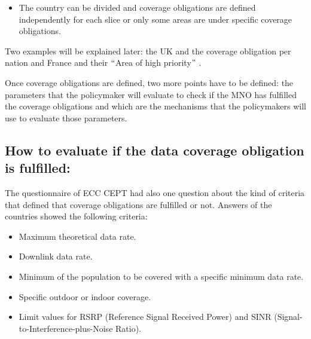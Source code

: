 {\begin{itemize}
\begin{itemize}
	\item The country can be divided and coverage obligations are defined independently for each slice or only some areas are under specific coverage obligations.
\end{itemize}
\end{itemize}

Two examples will be explained later: the UK and the coverage obligation per nation and France and their $``$Area of high priority$"$ .\par

Once coverage obligations are defined, two more points have to be defined: the parameters that the policymaker will evaluate to check if the MNO has fulfilled the coverage obligations and which are the mechanisms that the policymakers will use to evaluate those parameters.\par

\subsection*{How to evaluate if the data coverage obligation is fulfilled:}
The questionnaire of ECC CEPT \cite{2-08} had also one question about the kind of criteria that defined that coverage obligations are fulfilled or not. Answers of the countries showed the following criteria:\par

\begin{itemize}
	\item Maximum theoretical data rate.\par

	\item Downlink data rate.\par

	\item Minimum of the population to be covered with a specific minimum data rate.\par

	\item Specific outdoor or indoor coverage.\par

	\item Limit values for RSRP (Reference Signal Received Power) and SINR (Signal-to-Interference-plus-Noise Ratio).
\end{itemize}\par

}
